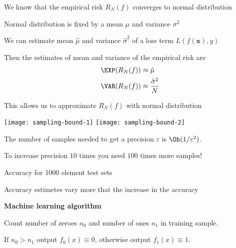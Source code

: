 \documentclass[landscape,footrule]{foils}
\renewcommand{\vec}[1]{\boldsymbol{#1}}
\begin{document}

We know that the empirical risk $R_N(f)$ converges to normal distribution
\begin{triangles}
\item Normal distribution is fixed by a mean $\mu$ and variance $\sigma^2$
\item We can estimate mean $\hat{\mu}$ and variance $\hat{\sigma}^2$ of a loss term $L(f(\vec{x}), y)$ 
\item Then the estimates of mean and variance of the empirical risk are
\begin{align*}
\EXP(R_N(f))&\approx \hat{\mu}\\
\VAR(R_N(f))&\approx \frac{\hat{\sigma}^2}{N}
\end{align*}
\item This allows us to approximate $R_N(f)$ with normal distribution 
\end{triangles}




\begin{center}
\texttt{[image: sampling-bound-1]}\hspace*{1cm}
\texttt{[image: sampling-bound-2]}
\end{center}
\vspace*{-0.5cm}

The number of samples needed to get a precision $\varepsilon$ is $\Oh(1/\varepsilon^2)$. 
\begin{triangles}
\item To increase precision $10$ times you need $100$ times more samples!
\end{triangles}

\enlargethispage{1cm}
\vspace{-3ex}
\begin{triangles}
\item Accuracy for 1000 element test sets
\item Accuracy estimetes vary more that the increase in the accuracy
\end{triangles}





\textbf{Machine learning algorithm}
\begin{triangles}
\item Count number of zeroes $n_0$ and number of ones $n_1$ in training sample.
\item If $n_0>n_1$ output $f_0(x)\equiv 0$, otherwise output $f_1(x)\equiv 1$.
\end{triangles}
\vspace*{1cm}
\end{document}
